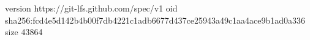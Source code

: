 version https://git-lfs.github.com/spec/v1
oid sha256:fcd4e5d142b4b00f7db4221c1adb6677d437ce25943a49c1aa4ace9b1ad0a336
size 43864
